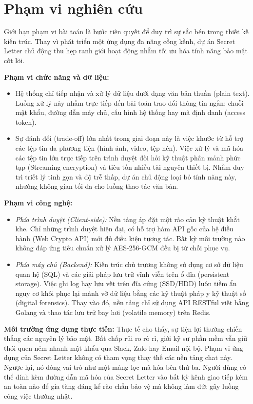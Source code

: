 \section{Phạm vi nghiên cứu}

Giới hạn phạm vi bài toán là bước tiên quyết để duy trì sự sắc bén trong thiết kế kiến trúc. Thay vì phát triển một ứng dụng đa năng cồng kềnh, dự án Secret Letter chủ động thu hẹp ranh giới hoạt động nhằm tối ưu hóa tính năng bảo mật cốt lõi.

\textbf{Phạm vi chức năng và dữ liệu:}
\begin{itemize}
    \item Hệ thống chỉ tiếp nhận và xử lý dữ liệu dưới dạng văn bản thuần (plain text). Luồng xử lý này nhắm trực tiếp đến bài toán trao đổi thông tin ngắn: chuỗi mật khẩu, đường dẫn máy chủ, cấu hình hệ thống hay mã định danh (access token).
    \item Sự đánh đổi (trade-off) lớn nhất trong giai đoạn này là việc khước từ hỗ trợ các tệp tin đa phương tiện (hình ảnh, video, tệp nén). Việc xử lý và mã hóa các tệp tin lớn trực tiếp trên trình duyệt đòi hỏi kỹ thuật phân mảnh phức tạp (Streaming encryption) và tiêu tốn nhiều tài nguyên thiết bị. Nhằm duy trì triết lý tinh gọn và độ trễ thấp, dự án chủ động loại bỏ tính năng này, nhường không gian tối đa cho luồng thao tác văn bản.
\end{itemize}

\textbf{Phạm vi công nghệ:}
\begin{itemize}
    \item \textit{Phía trình duyệt (Client-side):} Nền tảng áp đặt một rào cản kỹ thuật khắt khe. Chỉ những trình duyệt hiện đại, có hỗ trợ hàm API gốc của hệ điều hành (Web Crypto API) mới đủ điều kiện tương tác. Bất kỳ môi trường nào không đáp ứng tiêu chuẩn xử lý AES-256-GCM đều bị từ chối phục vụ.
    \item \textit{Phía máy chủ (Backend):} Kiến trúc chủ trương không sử dụng cơ sở dữ liệu quan hệ (SQL) và các giải pháp lưu trữ vĩnh viễn trên ổ đĩa (persistent storage). Việc ghi log hay lưu vết trên đĩa cứng (SSD/HDD) luôn tiềm ẩn nguy cơ khôi phục lại mảnh vỡ dữ liệu bằng các kỹ thuật pháp y kỹ thuật số (digital forensics). Thay vào đó, nền tảng chỉ sử dụng API RESTful viết bằng Golang và thao tác lưu trữ bay hơi (volatile memory) trên Redis.
\end{itemize}

\textbf{Môi trường ứng dụng thực tiễn:}
Thực tế cho thấy, sự tiện lợi thường chiến thắng các nguyên lý bảo mật. Bất chấp rủi ro rò rỉ, giới kỹ sư phần mềm vẫn giữ thói quen ném nhanh mật khẩu qua Slack, Zalo hay Email nội bộ. Phạm vi ứng dụng của Secret Letter không có tham vọng thay thế các nền tảng chat này. Ngược lại, nó đóng vai trò như một màng lọc mã hóa bên thứ ba. Người dùng có thể đính kèm đường dẫn mã hóa của Secret Letter vào bất kỳ kênh giao tiếp kém an toàn nào để gia tăng đáng kể rào chắn bảo vệ mà không làm đứt gãy luồng công việc thường nhật.